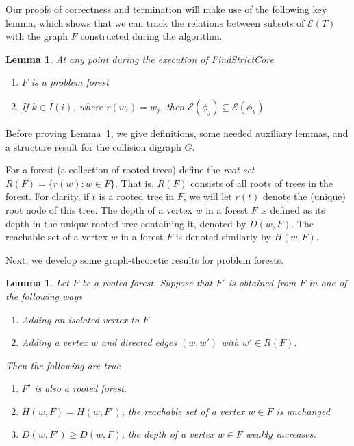 \documentclass[11pt,reqno]{amsart}
\newtheorem{lemma}[thm]{Lemma}
\theoremstyle{definition}
\numberwithin{equation}{section}
\newcommand{\pre}{\phi}
\newcommand{\sub}{\subseteq}
\newcommand{\fix}{\mathcal{E}}
\newcommand{\coll}{I}
\newcommand{\reach}{H}
\newcommand{\forest}{F}
\newcommand{\roott}{R}
\newcommand{\depth}{D}
\begin{document}
Our proofs of correctness and termination will make use of the following key lemma, which shows that we can track the relations between subsets of $\fix(T)$ with the graph $F$ constructed during the algorithm.

\begin{lemma} \label{lemma:key}
At any point during the execution of FindStrictCore 
\begin{enumerate}
\item $\forest$ is a problem forest \label{convlemma:forest}
\item If $k \in \coll(i)$, where $r(w_i) = w_j$, then $\fix(\pre_j) \sub \fix(\pre_k)$ \label{convlemma:coll}
\end{enumerate}
\end{lemma}

Before proving Lemma~\ref{lemma:key}, we give definitions, some needed auxiliary lemmas, and a structure result for the collision digraph $G$. 

For a forest (a collection of rooted trees) define the \emph{root set} $\roott(\forest) = \{r(w): w\in F\}$. 
That is, $\roott(\forest)$ consists of all roots of trees in the forest.
For clarity, if $t$ is a rooted tree in $\forest$, we will let $r(t)$ denote the (unique) root node of this tree.
The depth of a vertex $w$ in a forest $\forest$ is defined as its depth in the unique rooted tree containing it, denoted by $\depth(w, \forest)$.
The reachable set of a vertex $w$ in a forest $\forest$ is denoted similarly by $\reach(w, \forest)$.

Next, we develop some graph-theoretic results for problem forests. 

\begin{lemma} \label{lemma:forest}
Let $\forest$ be a rooted forest. 
Suppose that $\forest'$ is obtained from $\forest$ in one of the following ways 
\begin{enumerate}
\item Adding an isolated vertex to $\forest$ \label{forest:solo}
\item Adding a vertex $w$ and directed edges $(w,w')$ with $w' \in \roott(\forest)$. \label{forest:child}
\end{enumerate}
Then the following are true  
\begin{enumerate}
\item[(i)] $\forest'$ is also a rooted forest. 
\item[(ii)] $\reach(w,\forest) = \reach(w,\forest')$, the reachable set of a vertex $w \in \forest$ is unchanged
\item[(iii)] $\depth(w,\forest') \geq \depth(w,\forest)$, the depth of a vertex $w \in \forest$ weakly increases.
\end{enumerate}


\end{lemma}
\end{document}
